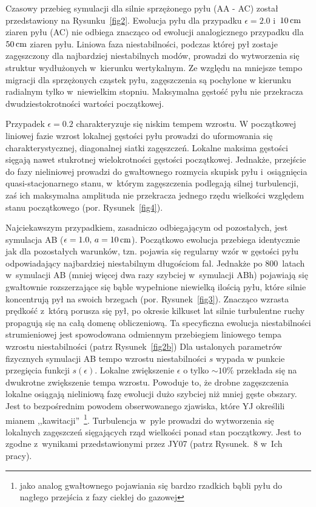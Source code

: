 Czasowy przebieg symulacji dla silnie sprzężonego pyłu (AA - AC) został
przedstawiony na Rysunku~\ref{fig2}. Ewolucja pyłu dla przypadku $\epsilon =
2.0$ i~$10\hbox{$\thinspace\textrm{cm}$}$ ziaren pyłu (AC) nie odbiega znacząco od ewolucji analogicznego
przypadku dla $50\hbox{$\thinspace\textrm{cm}$}$ ziaren pyłu. Liniowa faza niestabilności, podczas której
pył zostaje zagęszczony dla najbardziej niestabilnych modów, prowadzi do
wytworzenia się struktur wydłużonych w~kierunku wertykalnym. Ze względu na
mniejsze tempo migracji dla sprzężonych cząstek pyłu, zagęszczenia są pochylone
w kierunku radialnym tylko w~niewielkim stopniu. Maksymalna gęstość pyłu nie
przekracza dwudziestokrotności wartości początkowej.
\par Przypadek $\epsilon = 0.2$ charakteryzuje się niskim tempem wzrostu. W
początkowej liniowej fazie wzrost lokalnej gęstości pyłu prowadzi do uformowania
się charakterystycznej, diagonalnej siatki zagęszczeń. Lokalne maksima gęstości
sięgają nawet stukrotnej wielokrotności gęstości początkowej. Jednakże, przejście
do fazy nieliniowej prowadzi do gwałtownego rozmycia skupisk pyłu i~osiągnięcia
quasi-stacjonarnego stanu, w~którym zagęszczenia podlegają silnej turbulencji,
zaś ich maksymalna amplituda nie przekracza jednego rzędu wielkości względem
stanu początkowego (por. Rysunek~\ref{fig4}).

\par Najciekawszym przypadkiem, zasadniczo odbiegającym od pozostałych, jest
symulacja AB ($\epsilon=1.0,\, a=10\hbox{$\thinspace\textrm{cm}$}$). Początkowo ewolucja przebiega
identycznie jak dla pozostałych warunków, tzn. pojawia się regularny wzór
w gęstości pyłu odpowiadający najbardziej niestabilnym długościom fal. Jednakże 
po $800$~latach w~symulacji AB (mniej więcej dwa razy szybciej w~symulacji ABh)
pojawiają się gwałtownie rozszerzające się bąble wypełnione niewielką ilością
pyłu, które silnie koncentrują pył na swoich brzegach (por. Rysunek~\ref{fig3}). 
Znacząco wzrasta prędkość z~którą porusza się pył, po okresie kilkuset lat
silnie turbulentne ruchy propagują się na całą domenę obliczeniową. Ta
specyficzna ewolucja niestabilności strumieniowej jest spowodowana odmiennym
przebiegiem liniowego tempa wzrostu niestabilności (patrz Rysunek~\ref{fig2b})
Dla ustalonych parametrów fizycznych symulacji AB tempo wzrostu niestabilności
$s$ wypada w punkcie przegięcia funkcji $s(\epsilon)$. Lokalne zwiększenie
$\epsilon$ o tylko $\sim10\%$ przekłada się na dwukrotne zwiększenie tempa
wzrostu. Powoduje to, że drobne zagęszczenia lokalne osiągają nieliniową fazę
ewolucji dużo szybciej niż mniej gęste obszary.  Jest to bezpośrednim powodem
obserwowanego zjawiska, które YJ określili mianem ,,kawitacji''~\footnote{jako
analog gwałtownego pojawiania się bardzo rzadkich bąbli pyłu do nagłego
przejścia z fazy ciekłej do gazowej}.  Turbulencja w~pyle prowadzi do
wytworzenia się lokalnych zagęszczeń sięgających rząd wielkości ponad stan
początkowy. Jest to zgodne z~wynikami przedstawionymi przez JY07 (patrz
Rysunek.~8 w~Ich pracy).

